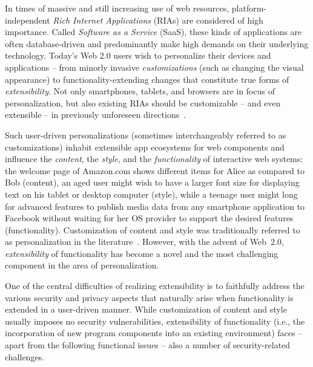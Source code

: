 \documentclass{src/acm_proc_article-sp} \else
\begin{document}
In times of massive and still increasing use of web
resources, plat\-form-in\-de\-pen\-dent \emph{Rich Internet
Applications} (RIAs) are considered of high importance.
Called \emph{Software as a Service} (SaaS), these kinds of
applications are often database-driven and predominantly
make high demands on their underlying technology. Today's
Web 2.0 users wish to personalize their devices and
applications -- from minorly invasive \emph{customizations}
(such as changing the visual appearance) to
functionality-extending changes that constitute true forms
of \emph{extensibility}. Not only smartphones, tablets, and
browsers are in focus of personalization, but also existing
RIAs should be customizable -- and even extensible -- in
previously unforeseen
directions~\cite{Arellano12:Personalization,Reischuk12:SAFE,Fredrikson2011:RePriv,Tesoriero2010:CAUCE,Jansen10:CustomizationMultiTenant,Kapitsaki2009:ContextAwareWebApps,Macias2008:CustomizationWebApps,Jorstad06:Personalisation}.

Such user-driven personalizations (sometimes interchangeably
referred to as customizations) inhabit extensible app
ecosystems for web components and influence the
\emph{content}, the \emph{style}, and the
\emph{functionality} of interactive web systems: the welcome
page of Amazon.com shows different items for Alice as
compared to Bob (content), an aged user might wish to have a
larger font size for displaying text on his tablet or
desktop computer (style), while a teenage user might long
for advanced features to publish media data from any
smartphone application to Facebook without waiting for her
OS provider to support the desired features (functionality).
Customization of content and style was traditionally
referred to as personalization in the
literature~\cite{Hardt:12personalization,Toch12:PersonalizationPrivacy,Jorstad06:Personalisation}.
However, with the advent of Web~2.0, \emph{extensibility} of
functionality has become a novel and the most challenging
component in the area of personalization.


One of the central difficulties of realizing extensibility
is to faithfully address the various security and privacy
aspects that naturally arise when functionality is extended
in a user-driven manner. While customization of content and
style usually imposes no security vulnerabilities,
extensibility of functionality (i.e., the
incorporation of new program components into an existing
environment) faces -- apart from the following functional
issues -- also a number of security-related challenges.
\end{document}
